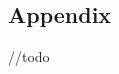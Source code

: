 \documentclass[a4paper,9pt]{extarticle}
\begin{document}
\begin{multicols*}{2}

\section{Appendix}
//todo

\end{multicols*}
\end{document}
